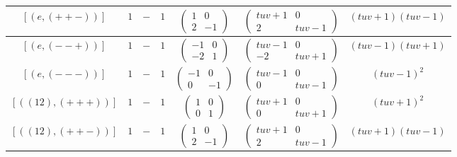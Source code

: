 \documentclass[11pt,english]{amsart}
\numberwithin{equation}{section}
\numberwithin{figure}{section}
\theoremstyle{plain}
\theoremstyle{plain}
\theoremstyle{definition}
\theoremstyle{remark}
\begin{document}
\begin{itemize}
\begin{table}[H]
\begin{tabular}{|c|c|c|c|c|c|c|}
        $[ (e, (++-)) ]$ & $1$ & $-$ & $1$ & 
        $\begin{pmatrix} 1 & 0 \\ 2 & -1 \end{pmatrix}$ & 
        $\begin{pmatrix} tuv+1 & 0 \\ 2 & tuv-1 \end{pmatrix}$ & 
        $(tuv+1)(tuv-1)$ \\\hline
        
        $[ (e, (--+)) ]$ & $1$ & $-$ & $1$ & 
        $\begin{pmatrix} -1 & 0 \\ -2 & 1 \end{pmatrix}$ & 
        $\begin{pmatrix} tuv-1 & 0 \\ -2 & tuv+1 \end{pmatrix}$ & 
        $(tuv-1)(tuv+1)$ \\\hline
        
        $[ (e, (---)) ]$ & $1$ & $-$ & $1$ & 
        $\begin{pmatrix} -1 & 0 \\ 0 & -1 \end{pmatrix}$ & 
        $\begin{pmatrix} tuv-1 & 0 \\ 0 & tuv-1 \end{pmatrix}$ & 
        $(tuv-1)^2$ \\\hline
        
        $[ ((12), (+++)) ]$ & $1$ & $-$ & $1$ & 
        $\begin{pmatrix} 1 & 0 \\ 0 & 1 \end{pmatrix}$ & 
        $\begin{pmatrix} tuv+1 & 0 \\ 0 & tuv+1 \end{pmatrix}$ & 
        $(tuv+1)^2$ \\\hline
        
        $[ ((12), (++-)) ]$ & $1$ & $-$ & $1$ & 
        $\begin{pmatrix} 1 & 0 \\ 2 & -1 \end{pmatrix}$ & 
        $\begin{pmatrix} tuv+1 & 0 \\ 2 & tuv-1 \end{pmatrix}$ & 
        $(tuv+1)(tuv-1)$ \\\hline
        

\end{tabular}
\end{table}
\end{itemize}
\end{document}
